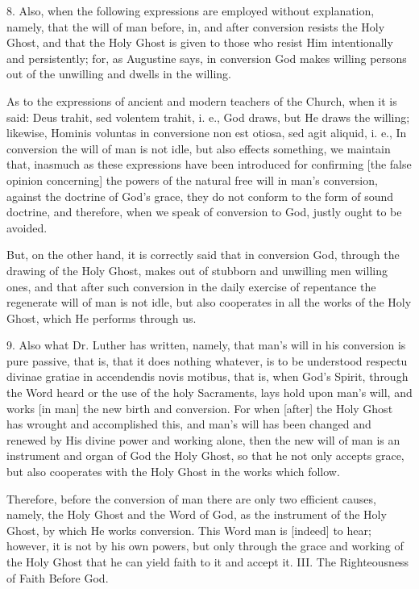 8. Also, when the following expressions are employed without explanation, namely, that the will of man before, in, and after conversion resists the Holy Ghost, and that the Holy Ghost is given to those who resist Him intentionally and persistently; for, as Augustine says, in conversion God makes willing persons out of the unwilling and dwells in the willing.

As to the expressions of ancient and modern teachers of the Church, when it is said: Deus trahit, sed volentem trahit, i. e., God draws, but He draws the willing; likewise, Hominis voluntas in conversione non est otiosa, sed agit aliquid, i. e., In conversion the will of man is not idle, but also effects something, we maintain that, inasmuch as these expressions have been introduced for confirming [the false opinion concerning] the powers of the natural free will in man's conversion, against the doctrine of God's grace, they do not conform to the form of sound doctrine, and therefore, when we speak of conversion to God, justly ought to be avoided.

But, on the other hand, it is correctly said that in conversion God, through the drawing of the Holy Ghost, makes out of stubborn and unwilling men willing ones, and that after such conversion in the daily exercise of repentance the regenerate will of man is not idle, but also cooperates in all the works of the Holy Ghost, which He performs through us.

9. Also what Dr. Luther has written, namely, that man's will in his conversion is pure passive, that is, that it does nothing whatever, is to be understood respectu divinae gratiae in accendendis novis motibus, that is, when God's Spirit, through the Word heard or the use of the holy Sacraments, lays hold upon man's will, and works [in man] the new birth and conversion. For when [after] the Holy Ghost has wrought and accomplished this, and man's will has been changed and renewed by His divine power and working alone, then the new will of man is an instrument and organ of God the Holy Ghost, so that he not only accepts grace, but also cooperates with the Holy Ghost in the works which follow.

Therefore, before the conversion of man there are only two efficient causes, namely, the Holy Ghost and the Word of God, as the instrument of the Holy Ghost, by which He works conversion. This Word man is [indeed] to hear; however, it is not by his own powers, but only through the grace and working of the Holy Ghost that he can yield faith to it and accept it.
III. The Righteousness of Faith Before God.

